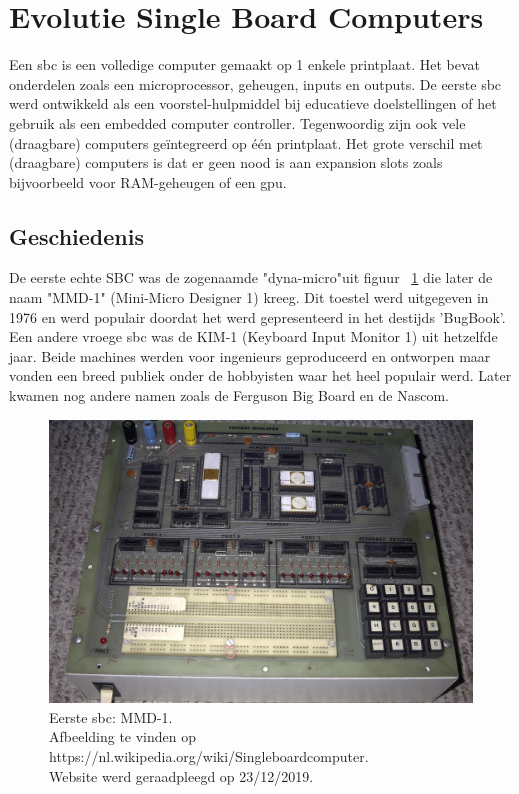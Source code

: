 \newpage	

\section{Evolutie Single Board Computers}
Een \gls{sbc} is een volledige computer gemaakt op 1 enkele printplaat. Het bevat onderdelen zoals een microprocessor, geheugen, inputs en outputs. De eerste \gls{sbc} werd ontwikkeld als een voorstel-hulpmiddel bij educatieve doelstellingen of het gebruik als een embedded computer controller. Tegenwoordig zijn ook vele (draagbare) computers ge\"integreerd op \'e\'en printplaat. Het grote verschil met (draagbare) computers is dat er geen nood is aan expansion slots zoals bijvoorbeeld voor RAM-geheugen of een \gls{gpu}.
	\subsection{Geschiedenis}
	De eerste echte SBC was de zogenaamde "dyna-micro"\space uit figuur ~\ref{fig:eersteSBC} die later de naam "MMD-1" (Mini-Micro Designer 1) kreeg. Dit toestel werd uitgegeven in 1976 en werd populair doordat het werd gepresenteerd in het destijds 'BugBook'. Een andere vroege \gls{sbc} was de KIM-1 (Keyboard Input Monitor 1) uit hetzelfde jaar. Beide machines werden voor ingenieurs geproduceerd en ontworpen maar vonden een breed publiek onder de hobbyisten waar het heel populair werd. Later kwamen nog andere namen zoals de Ferguson Big Board en de Nascom.

	\begin{figure}
		\centering
		\includegraphics[width=120mm]{afbeeldingen/Early_1976_MMD1_Prototype_most_chips_removed.PNG}
		\caption{Eerste \gls{sbc}: MMD-1. \\Afbeelding te vinden op https://nl.wikipedia.org/wiki/Singleboardcomputer.\\ Website werd geraadpleegd op 23/12/2019.}
		\label{fig:eersteSBC}
	\end{figure}
	
